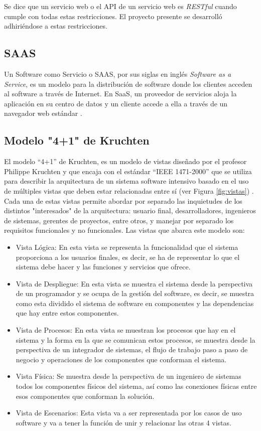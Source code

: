 Se dice que un servicio web o el API de un servicio web es \textit{RESTful} cuando cumple con todas estas restricciones. El proyecto presente se desarrolló adhiriéndose a estas restricciones.

\subsection{SAAS}

Un Software como Servicio o SAAS, por sus siglas en inglés \textit{Software as a Service}, es un modelo para la distribución de software donde los clientes acceden al software a través de Internet. En SaaS, un proveedor de servicios aloja la aplicación en su centro de datos y un cliente accede a ella a través de un navegador web estándar \cite{saas}.

\subsection{Modelo "4+1" de Kruchten}

El modelo “4+1” de Kruchten, es un modelo de vistas diseñado por el profesor Philippe Kruchten y que encaja con el estándar “IEEE 1471-2000” que se utiliza para describir la arquitectura de un sistema software intensivo basado en el uso de múltiples vistas que deben estar relacionadas entre sí (ver Figura \ref{fig:vistas}) \cite{vistasKruchten}. Cada una de estas vistas permite abordar por separado las inquietudes de los distintos "interesados" de la arquitectura: usuario final, desarrolladores, ingenieros de sistemas, gerentes de proyectos, entre otros, y manejar por separado los requisitos funcionales y no funcionales. Las vistas que abarca este modelo son:
\begin{itemize}
	\item Vista Lógica: En esta vista se representa la funcionalidad que el sistema proporciona a los usuarios finales, es decir, se ha de representar lo que el sistema debe hacer y las funciones y servicios que ofrece.
	\item Vista de Despliegue: En esta vista se muestra el sistema desde la perspectiva de un programador y se ocupa de la gestión del software, es decir, se muestra como esta dividido el sistema de software en componentes y las dependencias que hay entre estos componentes.
 	\item Vista de Procesos: En esta vista se muestran los procesos que hay en el sistema y la forma en la que se comunican estos procesos, se muestra desde la perspectiva de un integrador de sistemas, el flujo de trabajo paso a paso de negocio y operaciones de los componentes que conforman el sistema.
	\item Vista Física: Se muestra desde la perspectiva de un ingeniero de sistemas todos los componentes físicos del sistema, así como las conexiones físicas entre esos componentes que conforman la solución.
	\item Vista de Escenarios: Esta vista va a ser representada por los casos de uso  software y va a tener la función de unir y relacionar las otras 4 vistas.
\end{itemize}

